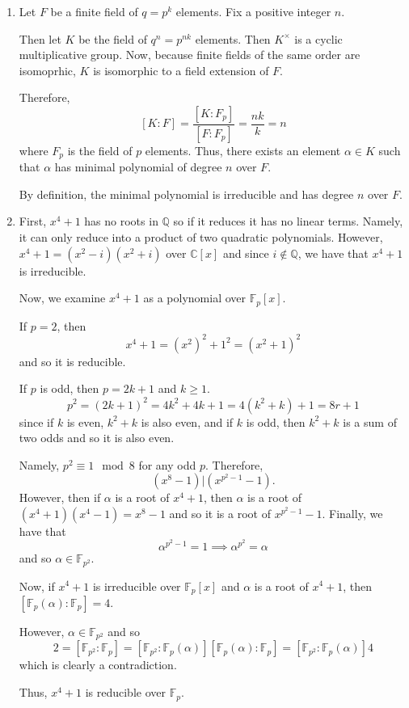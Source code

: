 \documentclass[12pt]{AlgebraQual}
\begin{document}
\begin{solution}$\,$
\begin{enumerate}[label=(\alph*)]
    \item Let $F$ be a finite field of $q=p^k$ elements. Fix a positive integer $n$.

    Then let $K$ be the field of $q^n=p^{nk}$ elements. Then $K^\times$ is a cyclic multiplicative group. Now, because finite fields of the same order are isomoprhic, $K$ is isomorphic to a field extension of $F.$

    Therefore, $$[K:F]=\frac{[K:F_p]}{[F:F_p]}=\frac{nk}{k}=n$$ where $F_p$ is the field of $p$ elements. Thus, there exists an element $\alpha\in K$ such that $\alpha$ has minimal polynomial of degree $n$ over $F.$

    By definition, the minimal polynomial is irreducible and has degree $n$ over $F.$

    \item First, $x^4+1$ has no roots in $\mathbb{Q}$ so if it reduces it has no linear terms. Namely, it can only reduce into a product of two quadratic polynomials. However, $x^4+1=(x^2-i)(x^2+i)$ over $\mathbb{C}[x]$ and since $i\notin\mathbb{Q}$, we have that $x^4+1$ is irreducible.

    Now, we examine $x^4+1$ as a polynomial over $\mathbb{F}_p[x]$.

    If $p=2$, then $$x^4+1=(x^2)^2+1^2=(x^2+1)^2$$ and so it is reducible.

    If $p$ is odd, then $p=2k+1$ and $k\ge1$. $$p^2=(2k+1)^2=4k^2+4k+1=4(k^2+k)+1=8r+1$$ since if $k$ is even, $k^2+k$ is also even, and if $k$ is odd, then $k^2+k$ is a sum of two odds and so it is also even.

    Namely, $p^2\equiv 1\mod 8$ for any odd $p.$ Therefore, $$(x^8-1)|(x^{p^2-1}-1).$$ However, then if $\alpha$ is a root of $x^4+1$, then $\alpha$ is a root of $(x^4+1)(x^4-1)=x^8-1$ and so it is a root of $x^{p^2-1}-1$. Finally, we have that $$\alpha^{p^2-1}=1\implies \alpha^{p^2}=\alpha$$ and so $\alpha\in\mathbb{F}_{p^2}.$

     Now, if $x^4+1$ is irreducible over $\mathbb{F}_p[x]$ and $\alpha$ is a root of $x^4+1$, then $[\mathbb{F}_p(\alpha):\mathbb{F}_p]=4$.

    However, $\alpha\in \mathbb{F}_{p^2}$ and so $$2=[\mathbb{F}_{p^2}:\mathbb{F}_p]=[\mathbb{F}_{p^2}:\mathbb{F}_p(\alpha)][\mathbb{F}_p(\alpha):\mathbb{F}_p]=[\mathbb{F}_{p^2}:\mathbb{F}_p(\alpha)]4$$ which is clearly a contradiction.

    Thus, $x^4+1$ is reducible over $\mathbb{F}_p$.
\end{enumerate}
\end{solution}
\newpage
\end{document}
